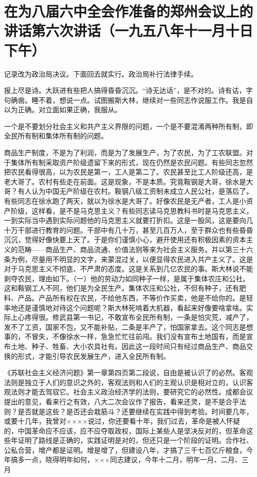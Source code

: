 \section[在为八届六中全会作准备的郑州会议上的讲话第六次讲话（一九五八年十一月十日下午）]{在为八届六中全会作准备的郑州会议上的讲话第六次讲话（一九五八年十一月十日下午）}


记录改为政治局决议。下面回去就实行。政治局补行法律手续。

报上尽是诗。大跃进有些把人搞得昏昏沉沉。“诗无达话”，是不对的。诗有诂，字句确凿。睡不着，想说一点。试图搬斯大林，继续对一些同志作说服工作。我是自以为正确。对立面如果正确，我服从。

一个是不要划分社会主义和共产主义界限的问题，一个是不要混淆两种所有制，即全民所有制和集体所有制的问题。

商品生产制度，不是为了利润，而是为了发展生产，为了农民，为了工农联盟。对于集体所有制采取资产阶级遗留下来的形式，现在仍然是农民问题。有些同志忽然把农民看得很高，以为农民是第一，工人是第二了。农民甚至比工人阶级还高，是老大哥了。农村有些走在前面。这是现象，不是本质。究竟鞍钢是大哥，徐水是大哥？有人认为中国无产阶级在农村。鞍钢八级工资制未成立人民公社，是落后了。有些同志在徐水跑了两天，就以为徐水是大哥了。好像农民是无产者，工人是小资产阶级，这样看，是不是马克思主义？有些同志读马克思教科书时是马克思主义，一到实际当中遇到实际问题他的马克思主义就要打折扣。这是一股风，这是要向几十万干部进行教育的问题。干部中有几十万，甚至几百万人，至于群众也有些昏昏沉沉，觉得好像快要上天了。于是你们谨慎小心，避开使用还有积极因素的资本主义的范畴——商品生产、商品流通、价值法则等来为社会主义服务。并以第三十六条为例，尽量用不明显的文字，来蒙混过关，以便显得农民进入共产主义了。这是对于马克思主义不彻底、不严肃的态度。这是关系到几亿农民的事。斯大林说不能剥夺农民，理由如下。（一）他的劳动力如同种子一样，是属于集体农庄和公社。这和鞍钢工人不同，他们是为全民生产。集体农庄和公社，不但有种子，还有肥料、产品。产品所有权在农民，不给他东西，不等价作买卖，他是不给你的。是轻率地还是谨慎地对待这个问题呢？斯大林死啃着大机器，看起来好像要啥拿啥。实际上心疼得很。修武县第一书记，不敢宣布全民所有制，一条是怕灾荒，减产了，发不了工资，国家不包，又不能补贴，二条是丰产了，怕国家拿去。这个同志是想事的，不冒失，不像徐水一样，急急忙忙往前闯。我们没有宣布土地国有，而是宣布土地、种子、牲畜、大小农具社有。因此这一段时间只有经过商品生产、商品交换的形式，才能引导农民发展生产，进入全民所有制。

《苏联社会主义经济问题》第一章第四页第二段说，自由是被认识了的必然。客观法则是独立于人们的意识之外的，客观法则和人们的主观认识是相对立的，认识客观法则才能去驾驭它。社会主义政治经济学的法则，要研究它的必然性。成都会议提出的意见，看来行之有效，八大二次会议作了报告，看来还灵，是不是合乎法则？是否就是这些？是否还会栽筋斗？还要继续在实践中得到考验。时间要几年，或要十几年，我曾对××××说过，你还要看十年，我们过去，革命是被人怀疑的，中国革命应不应该，应不应夺取政权，国际上某些人是坚决反对的，但革命这些年证明了路线是正确的，实践证明是对的，但还只是一个阶段的证明。合作社、公私合营，增产都是证明。增是增了，但建设八年，才搞了三千七百亿斤粮食，今年搞多一点，晓得明年如何，×××同志建议，今年十二月，明年一月、二月、三月

